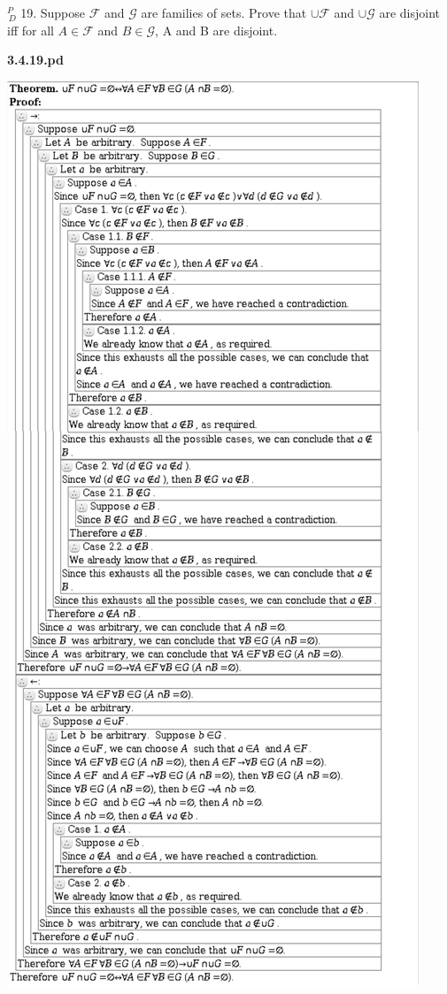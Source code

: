\documentclass{article}
\begin{document}
\vspace{30pt}

$^{\textit{P}}_{\, \textit{D}}$ 19. Suppose $\mathcal{F}$ and $\mathcal{G}$ are families of sets. Prove that $\cup \mathcal{F}$ and $\cup \mathcal{G}$ are disjoint iff for all $A \in \mathcal{F}$ and $B \in \mathcal{G}$, A and B are disjoint.
\vspace{30pt}

\textbf{3.4.19.pd}
\vspace{10pt}

\includegraphics[scale=0.15]{3_4_19}
\end{document}
